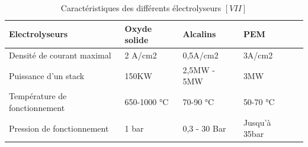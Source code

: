 \documentclass[11pt,french,a4paper]{article}
\begin{document}
\begin{table}[h]
\centering
\begin{tabular}{|l|l|l|l|l|}
\hline
Electrolyseurs & Oxyde solide & Alcalins & PEM \\
\hline
Densité de courant maximal & 2 A/cm2 &0,5A/cm2 & 3A/cm2 \\
\hline
Puissance d’un stack & 150KW& 2,5MW - 5MW&3MW \\
\hline
Température de fonctionnement &650-1000 °C&70-90 °C&50-70 °C\\
\hline
Pression de fonctionnement&1 bar& 0,3 - 30 Bar & Jusqu'à 35bar \\
\hline
\end{tabular}
\caption{Caractéristiques des différents électrolyseurs $[VII]$}
\end{table}
\end{document}
